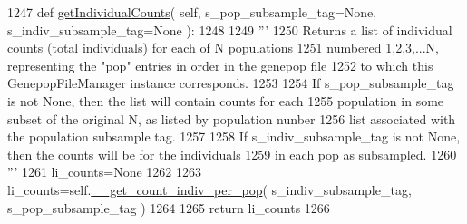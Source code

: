 \begin{DoxyCode}
1247     \textcolor{keyword}{def }\hyperlink{classnegui_1_1genepopfilemanager_1_1GenepopFileManager_aca743749002b9828cd66730e42db4387}{getIndividualCounts}( self, s\_pop\_subsample\_tag=None, s\_indiv\_subsample\_tag=None 
      ):
1248 
1249         \textcolor{stringliteral}{'''}
1250 \textcolor{stringliteral}{        Returns a list of individual counts (total individuals) for each of N populations}
1251 \textcolor{stringliteral}{        numbered 1,2,3,...N, representing the "pop" entries in order in the genepop file}
1252 \textcolor{stringliteral}{        to which this GenepopFileManager instance corresponds.}
1253 \textcolor{stringliteral}{}
1254 \textcolor{stringliteral}{        If s\_pop\_subsample\_tag is not None, then the list will contain counts for each}
1255 \textcolor{stringliteral}{        population in some subset of the original N, as listed by population nunber }
1256 \textcolor{stringliteral}{        list associated with the population subsample tag.}
1257 \textcolor{stringliteral}{}
1258 \textcolor{stringliteral}{        If s\_indiv\_subsample\_tag is not None, then the counts will be for the individuals}
1259 \textcolor{stringliteral}{        in each pop as subsampled.}
1260 \textcolor{stringliteral}{        '''}
1261         li\_counts=\textcolor{keywordtype}{None}
1262 
1263         li\_counts=self.\hyperlink{classnegui_1_1genepopfilemanager_1_1GenepopFileManager_a8efe11151549d7da2bc024f836491af4}{\_\_get\_count\_indiv\_per\_pop}( s\_indiv\_subsample\_tag, 
      s\_pop\_subsample\_tag ) 
1264 
1265         \textcolor{keywordflow}{return} li\_counts
1266 
\end{DoxyCode}
